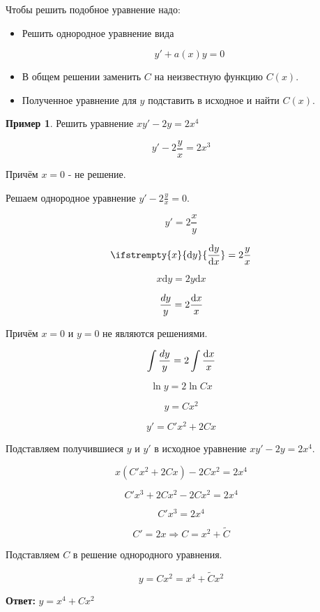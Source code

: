 \documentclass[a4paper, 14pt]{article}
\newcommand{\dx}{\mathrm{d}x}
\newcommand{\dy}{\mathrm{d}y}
\newcommand{\dv}[2]{%
  \ifstrempty{#2}%
    {\mathrm{d}#1}%
    {\frac{\mathrm{d}#1}{\mathrm{d}#2}}%
}
\theoremstyle{definition}
\newtheorem*{example}{Пример}
\newenvironment{answer}
  {\par\noindent\textbf{Ответ:}}
  {\par}
\begin{document}
Чтобы решить подобное уравнение надо:
\begin{itemize}
\item \textbf{}Решить однородное уравнение вида

\[y' + a(x)y = 0\]

\item \textbf{}В общем решении заменить $C$ на неизвестную функцию $C(x)$.

\item \textbf{}Полученное уравнение для $y$ подставить в исходное и найти $C(x)$.
\end{itemize}
\begin{example}
    Решить уравнение $xy'-2y=2x^4$

    \[y'-2\frac{y}{x} = 2x^3\]

    Причём $x=0$ - не решение.

    Решаем однородное уравнение $y'-2\frac{y}{x} = 0$.

    \[y'=2\frac{x}{y}\]

    \[\dv{y}{x} = 2\frac{y}{x}\]

    \[x\dy= 2y\dx\]

     \[\frac{\\dy}{y} = 2\frac{\dx}{x}\]

     Причём $x=0$ и $y=0$ не являются решениями.

    \[\int{\frac{\\dy}{y}} = 2\int{\frac{\dx}{x}}\]

    \[\ln{y} = 2\ln{Cx}\]

    \[y = Cx^2\]

    \[y' = C'x^2+2Cx\]

Подставляем получившиеся $y$ и $y'$ в исходное уравнение $xy'-2y=2x^4$.

\[x(C'x^2+2Cx)- 2Cx^2 = 2x^4\]

\[C'x^3+2Cx^2- 2Cx^2 = 2x^4\]

\[C'x^3= 2x^4\]

\[C'= 2x \Longrightarrow C=x^2+\tilde{C}\]

Подставляем $C$ в решение однородного уравнения.

\[y = Cx^2 = x^4+\tilde{C}x^2\]
\end{example}
\begin{answer}
    $y= x^4+Cx^2$
\end{answer}
\end{document}
